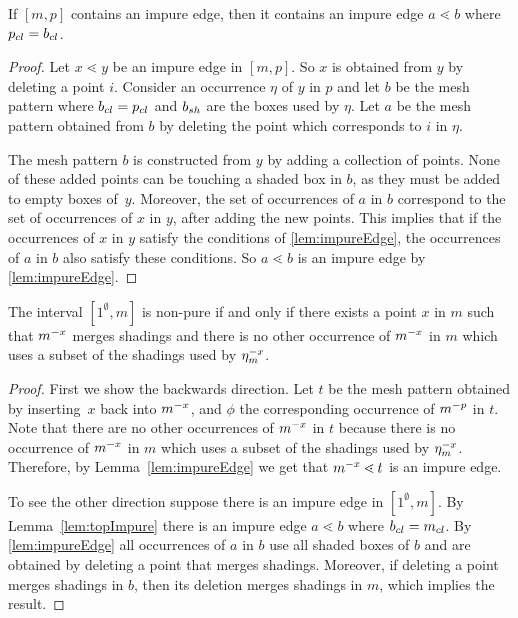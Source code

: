 \documentclass[11pt,a4paper,oneside]{article}
\begin{document}
\begin{lem}\label{lem:topImpure}
If $[m,p]$ contains an impure edge, then it contains an impure edge
$a\lessdot b$ where $\cl{p}=\cl{b}$.
\begin{proof}
Let $x\lessdot y$ be an impure edge in $[m,p]$. So $x$ is obtained from $y$
by deleting a point $i$. Consider an occurrence
$\eta$ of $y$ in $p$ and let $b$ be the mesh pattern where $\cl{b}=\cl{p}$
and $\sh{b}$ are the boxes used by $\eta$. Let $a$ be the mesh pattern obtained from $b$
by deleting the point which corresponds to $i$ in $\eta$.

The mesh pattern $b$ is constructed from $y$ by adding a collection of points.
None of these added points can be touching a shaded box in $b$, as they must be added to empty
boxes of~$y$. Moreover, the set of occurrences of $a$ in $b$ correspond to the set
of occurrences of $x$ in $y$, after adding the new points. This implies that if the occurrences of $x$ in $y$ satisfy the conditions of \cref{lem:impureEdge}, the
occurrences of $a$ in $b$ also satisfy these conditions. So $a\lessdot b$ is an
impure edge by \cref{lem:impureEdge}.
\end{proof}
\end{lem}

\begin{prop}
The interval $[1^\emptyset,m]$ is non-pure if and
only if there exists a point $x$ in $m$ such that $\mX{m}{x}$ merges shadings and
there is no other occurrence of $\mX{m}{x}$ in $m$ which uses a subset of the shadings
used by $\occX{m}{x}$.
\begin{proof}
First we show the backwards direction. Let $t$  be the mesh pattern obtained by
inserting~$x$ back into $\mX{m}{x}$, and $\phi$ the corresponding occurrence of $\mX{m}{p}$
in $t$. Note that there are no other occurrences of $\mX{m}{x}$ in $t$ because there is
no occurrence of $\mX{m}{x}$ in $m$ which uses a subset of the shadings
used by $\occX{m}{x}$. Therefore, by Lemma~\ref{lem:impureEdge} we get that
$\mX{m}{x}\lessdot t$ is an impure edge.

To see the other direction suppose there is an impure edge in $[1^{\emptyset},m]$. By
Lemma~\ref{lem:topImpure} there is an impure edge $a\lessdot b$ where
$\cl{b}=\cl{m}$. By \cref{lem:impureEdge} all occurrences of $a$ in
$b$ use all shaded boxes of $b$ and are obtained by deleting a point that merges
shadings. Moreover, if deleting a point merges shadings in $b$, then its deletion merges shadings in $m$,
which implies the result.
\end{proof}
\end{prop}
\end{document}
